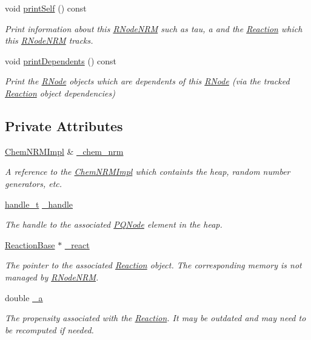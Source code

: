 \begin{DoxyCompactItemize}
void \hyperlink{classRNodeNRM_ae04662a366d10fd7b033d1aa3f9f2817}{print\+Self} () const 
\begin{DoxyCompactList}\small\item\em Print information about this \hyperlink{classRNodeNRM}{R\+Node\+N\+R\+M} such as tau, a and the \hyperlink{classReaction}{Reaction} which this \hyperlink{classRNodeNRM}{R\+Node\+N\+R\+M} tracks. \end{DoxyCompactList}\item 
void \hyperlink{classRNodeNRM_ac3fed6dc98796d32c294f505c2fcc466}{print\+Dependents} () const 
\begin{DoxyCompactList}\small\item\em Print the \hyperlink{classRNode}{R\+Node} objects which are dependents of this \hyperlink{classRNode}{R\+Node} (via the tracked \hyperlink{classReaction}{Reaction} object dependencies) \end{DoxyCompactList}\end{DoxyCompactItemize}
\subsection*{Private Attributes}
\begin{DoxyCompactItemize}
\item 
\hyperlink{classChemNRMImpl}{Chem\+N\+R\+M\+Impl} \& \hyperlink{classRNodeNRM_ae7a8eb17ab2dc835ac90adc54027f96f}{\+\_\+chem\+\_\+nrm}
\begin{DoxyCompactList}\small\item\em A reference to the \hyperlink{classChemNRMImpl}{Chem\+N\+R\+M\+Impl} which containts the heap, random number generators, etc. \end{DoxyCompactList}\item 
\hyperlink{ChemNRMImpl_8h_a386f0f8003798d7e30dc670c31be1992}{handle\+\_\+t} \hyperlink{classRNodeNRM_a8330d3bffc447a421484615c84ab080b}{\+\_\+handle}
\begin{DoxyCompactList}\small\item\em The handle to the associated \hyperlink{classPQNode}{P\+Q\+Node} element in the heap. \end{DoxyCompactList}\item 
\hyperlink{classReactionBase}{Reaction\+Base} $\ast$ \hyperlink{classRNodeNRM_a36a50436adc1814fab1719a0ed7caf3c}{\+\_\+react}
\begin{DoxyCompactList}\small\item\em The pointer to the associated \hyperlink{classReaction}{Reaction} object. The corresponding memory is not managed by \hyperlink{classRNodeNRM}{R\+Node\+N\+R\+M}. \end{DoxyCompactList}\item 
double \hyperlink{classRNodeNRM_aaaa96176cd44d7ab30778d73c65677d8}{\+\_\+a}
\begin{DoxyCompactList}\small\item\em The propensity associated with the \hyperlink{classReaction}{Reaction}. It may be outdated and may need to be recomputed if needed. \end{DoxyCompactList}\end{DoxyCompactItemize}


